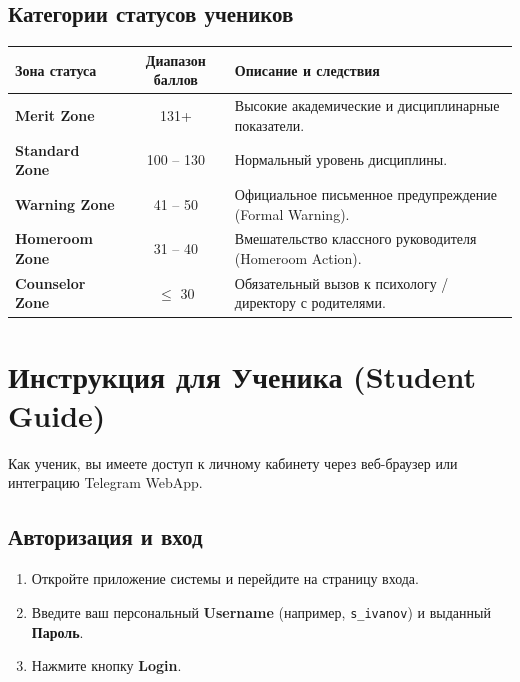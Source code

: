 \documentclass[12pt,a4paper]{article}
\begin{document}
\subsection{Категории статусов учеников}
\begin{table}[h!]
\centering
\begin{tabularx}{\textwidth}{|l|c|X|}
\hline
\textbf{Зона статуса} & \textbf{Диапазон баллов} & \textbf{Описание и следствия} \\ \hline
\textbf{Merit Zone} & 131+ & Высокие академические и дисциплинарные показатели. \\ \hline
\textbf{Standard Zone} & 100 -- 130 & Нормальный уровень дисциплины. \\ \hline
\textbf{Warning Zone} & 41 -- 50 & Официальное письменное предупреждение (Formal Warning). \\ \hline
\textbf{Homeroom Zone} & 31 -- 40 & Вмешательство классного руководителя (Homeroom Action). \\ \hline
\textbf{Counselor Zone} & $\le$ 30 & Обязательный вызов к психологу / директору с родителями. \\ \hline
\end{tabularx}
\end{table}

\newpage

\section{Инструкция для Ученика (Student Guide)}

Как ученик, вы имеете доступ к личному кабинету через веб-браузер или интеграцию Telegram WebApp.

\subsection{Авторизация и вход}
\begin{enumerate}
    \item Откройте приложение системы и перейдите на страницу входа.
    \item Введите ваш персональный \textbf{Username} (например, \texttt{s\_ivanov}) и выданный \textbf{Пароль}.
    \item Нажмите кнопку \textbf{Login}.
\end{enumerate}
\end{document}
